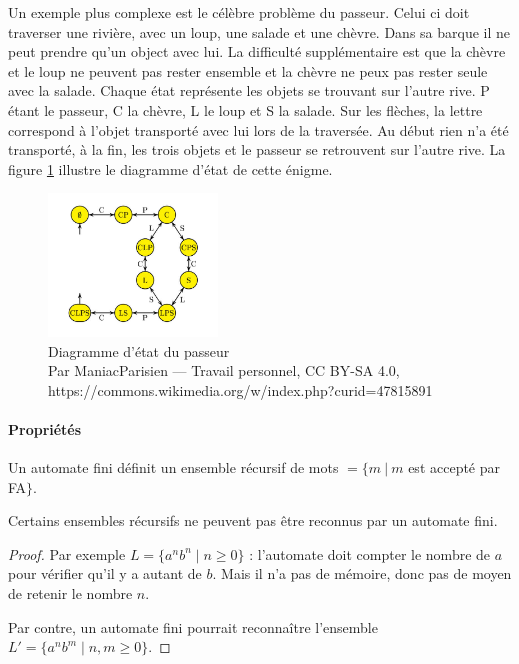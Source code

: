 Un exemple plus complexe est le célèbre problème du passeur. Celui ci doit traverser une rivière, avec un loup, une salade et une chèvre. Dans sa barque il ne peut prendre qu'un object avec lui. La difficulté supplémentaire est que la chèvre et le loup ne peuvent pas rester ensemble et la chèvre ne peux pas rester seule avec la salade. Chaque état représente les objets se trouvant sur l'autre rive. P étant le passeur, C la chèvre, L le loup et S la salade. Sur les flèches, la lettre correspond à l'objet transporté avec lui lors de la traversée. Au début rien n'a été transporté, à la fin, les trois objets et le passeur se retrouvent sur l'autre rive.
La figure \ref{Salade} illustre le diagramme d'état de cette énigme.
\begin{figure}[h]
	\centering
	\includegraphics[width=0.4\textwidth]{Images/ChevreLoupSalade.jpg}
	\caption{Diagramme d'état du passeur \\{\footnotesize Par ManiacParisien — Travail personnel, CC BY-SA 4.0, https://commons.wikimedia.org/w/index.php?curid=47815891}}
	\label{Salade}
\end{figure}

\paragraph{Propriétés}
\begin{myprop}
	Un automate fini définit un ensemble récursif de mots $=\{m \ |\ m$ est
		accepté par FA$\}$.
\end{myprop}

\begin{myprop}
	Certains ensembles récursifs ne peuvent pas être reconnus par un
	automate fini.
    
    \begin{proof}
    Par exemple $L = \{ a^n b^n \mid n\geq 0\}$ : l'automate doit compter le nombre de $a$ pour vérifier qu'il y a autant de $b$. Mais il n'a pas de mémoire, donc pas de moyen de retenir le nombre $n$.
    
    Par contre, un automate fini pourrait reconnaître l'ensemble $L' = \{a^n b^m \mid n,m\geq 0\}$.
    \end{proof}
\end{myprop}

